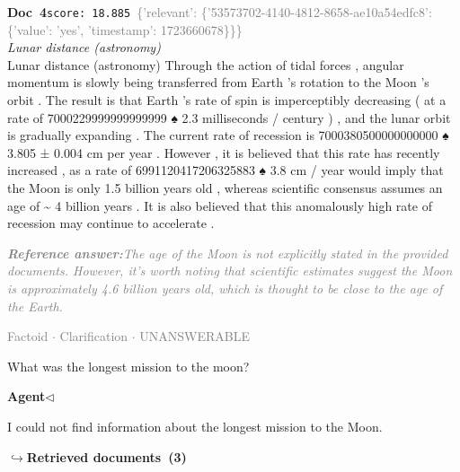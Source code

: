 \documentclass[a4paper,11pt]{article}
\begin{document}
\begin{docenv}
{\footnotesize\textcolor{doccolor}{\textbf{Doc~4}}}\hfill{\tiny\texttt{score:~18.885}}\ {\tiny\textcolor{gray}{\{'relevant': \{'53573702-4140-4812-8658-ae10a54edfc8': \{'value': 'yes', 'timestamp': 1723660678\}\}\}}}\\[3pt]
{\small\textit{Lunar distance (astronomy)}}\\[2pt]
\vspace{2pt}
{\footnotesize Lunar distance (astronomy)
Through the action of tidal forces , angular momentum is slowly being transferred from Earth 's rotation to the Moon 's orbit . The result is that Earth 's rate of spin is imperceptibly decreasing ( at a rate of 7000229999999999999 ♠ 2.3 milliseconds / century ) , and the lunar orbit is gradually expanding . The current rate of recession is 7000380500000000000 ♠ 3.805 ± 0.004 cm per year . However , it is believed that this rate has recently increased , as a rate of 6991120417206325883 ♠ 3.8 cm / year would imply that the Moon is only 1.5 billion years old , whereas scientific consensus assumes an age of \textasciitilde{} 4 billion years . It is also believed that this anomalously high rate of recession may continue to accelerate .}
\end{docenv}
\begin{refanswerenv}
{\footnotesize\textit{\textcolor{gray}{\textbf{Reference answer:}\enspace The age of the Moon is not explicitly stated in the provided documents. However, it's worth noting that scientific estimates suggest the Moon is approximately 4.6 billion years old, which is thought to be close to the age of the Earth.}}}
\end{refanswerenv}
\vspace{0.5em}
\hfill{\tiny\textcolor{gray}{Factoid $\cdot$ Clarification $\cdot$ UNANSWERABLE}}
\begin{userbubble}
What was the longest mission to the moon?
\end{userbubble}
\noindent\hfill{\small\textcolor{agentcolor}{\textbf{Agent\enspace$\triangleleft$}}}
\begin{agentbubble}
I could not find information about the longest mission to the Moon.
\end{agentbubble}
\noindent\hfill{\footnotesize\textcolor{doccolor}{\textbf{$\hookrightarrow$\enspace Retrieved documents~(3)}}}
\end{document}
